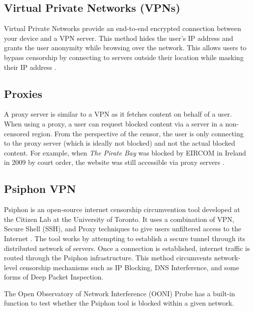 \subsection{Virtual Private Networks (VPNs)}

Virtual Private Networks provide an end-to-end encrypted connection between your device and a VPN server. This method hides the user's IP address and grants the user anonymity while browsing over the network. This allows users to bypass censorship by connecting to servers outside their location while masking their IP address \cite{TomsGuideVPN}.

\subsection{Proxies}

A proxy server is similar to a VPN as it fetches content on behalf of a user. When using a proxy, a user can request blocked content via a server in a non-censored region. From the perspective of the censor, the user is only connecting to the proxy server (which is ideally not blocked) and not the actual blocked content. For example, when \textit{The Pirate Bay} was blocked by EIRCOM in Ireland in 2009 by court order, the website was still accessible via proxy servers \cite{PirateBayBlocked2009}.

\subsection{Psiphon VPN}

Psiphon is an open-source internet censorship circumvention tool developed at the Citizen Lab at the University of Toronto. It uses a combination of VPN, Secure Shell (SSH), and Proxy techniques to give users unfiltered access to the Internet \cite{ooniPsiphonTest}. The tool works by attempting to establish a secure tunnel through its distributed network of servers. Once a connection is established, internet traffic is routed through the Psiphon infrastructure. This method circumvents network-level censorship mechanisms such as IP Blocking, DNS Interference, and some forms of Deep Packet Inspection. 

The Open Observatory of Network Interference (OONI) Probe has a built-in function to test whether the Psiphon tool is blocked within a given network.